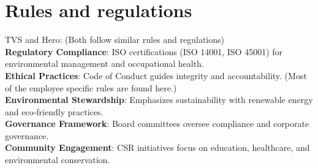 \section{Rules and regulations}
TVS and Hero: (Both follow similar rules and regulations)\\
\textbf{Regulatory Compliance}: ISO certifications (ISO 14001, ISO 45001) for environmental management and occupational health.\\
\textbf{Ethical Practices}: Code of Conduct guides integrity and accountability. (Most of the employee specific rules are found here.)\\
\textbf{Environmental Stewardship}: Emphasizes sustainability with renewable energy and eco-friendly practices.\\
\textbf{Governance Framework}: Board committees oversee compliance and corporate governance.\\
\textbf{Community Engagement}: CSR initiatives focus on education, healthcare, and environmental conservation.